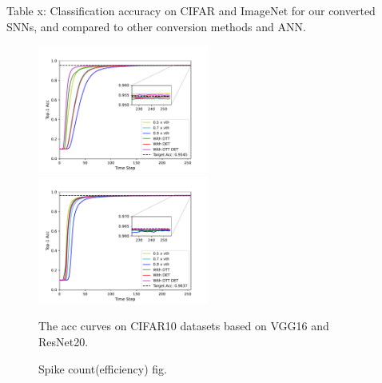 \documentclass{article}
\begin{document}
Table x: Classification accuracy on CIFAR and ImageNet for our converted SNNs, and compared to other conversion methods and ANN.



\begin{figure}[h]
  \centering
  \includegraphics[width=0.5\textwidth]{./fig/acc_cifar10_vgg16.pdf}
  \includegraphics[width=0.5\textwidth]{./fig/acc_cifar10_resnet20.pdf}
  \caption{The acc curves on CIFAR10 datasets based on VGG16 and ResNet20.}
\end{figure}


\begin{figure}[h]
  \centering
  \fbox{\rule[-.5cm]{0cm}{4cm} \rule[-.5cm]{4cm}{0cm}}
  \caption{Spike count(efficiency) fig.}
\end{figure}


\begin{table}[htbp]


\end{table}
\end{document}
